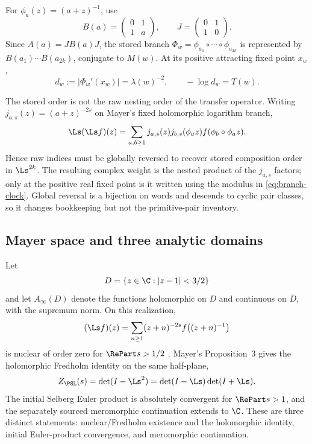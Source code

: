 For $\phi_a(z)=(a+z)^{-1}$, use
\[
  B(a)=\begin{pmatrix}0&1\\1&a\end{pmatrix},
  \qquad J=\begin{pmatrix}0&1\\1&0\end{pmatrix}.
\]
Since $A(a)=JB(a)J$, the stored branch
$\Phi_w=\phi_{a_1}\circ\cdots\circ\phi_{a_{2k}}$ is represented by
$B(a_1)\cdots B(a_{2k})$, conjugate to $M(w)$.  At its positive attracting
fixed point $x_w$,
\begin{equation}
  d_w:=|\Phi_w'(x_w)|=\lambda(w)^{-2},
  \qquad -\log d_w=T(w).
  \label{eq:branch-clock}
\end{equation}

The stored order is not the raw nesting order of the transfer operator.
Writing $j_{a,s}(z)=(a+z)^{-2s}$ on Mayer's fixed holomorphic logarithm
branch,
\[
  \Ls(\Ls f)(z)
  =\sum_{a,b\ge1}j_{a,s}(z)j_{b,s}(\phi_a z)
    f(\phi_b\circ\phi_a z).
\]
Hence raw indices must be globally reversed to recover stored composition
order in $\Ls^{2k}$.  The resulting complex weight is the nested product of
the $j_{a,s}$ factors; only at the positive real fixed point is it written
using the modulus in \eqref{eq:branch-clock}.  Global reversal is a bijection
on words and descends to cyclic pair classes, so it changes bookkeeping but
not the primitive-pair inventory.

\subsection{Mayer space and three analytic domains}

Let
\[
  D=\{z\in\C:|z-1|<3/2\}
\]
and let $A_\infty(D)$ denote the functions holomorphic on $D$ and continuous
on $\overline D$, with the supremum norm.  On this realization,
\begin{equation}
  (\Ls f)(z)=\sum_{n\ge1}(z+n)^{-2s}
  f\!\left((z+n)^{-1}\right)
  \label{eq:mayer-operator}
\end{equation}
is nuclear of order zero for $\RePart s>1/2$
\citep{Mayer1990Gauss,Mayer1990SelbergPreprint}.  Mayer's Proposition~3
gives the holomorphic Fredholm identity on the same half-plane,
\begin{equation}
  Z_{\PSL}(s)
  =\det(I-\Ls^2)
  =\det(I-\Ls)\det(I+\Ls).
  \label{eq:mayer-selberg}
\end{equation}
The initial Selberg Euler product is absolutely convergent for
$\RePart s>1$, and the separately sourced meromorphic continuation extends
to $\C$.  These are three distinct statements: nuclear/Fredholm existence and
the holomorphic identity, initial Euler-product convergence, and meromorphic
continuation.

